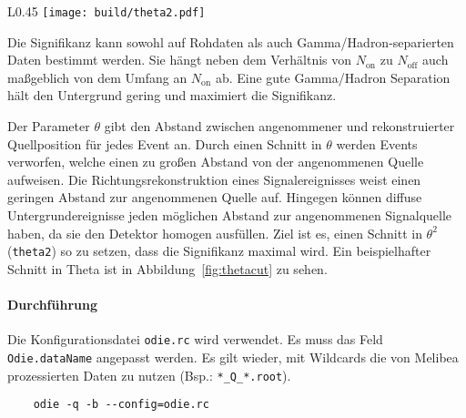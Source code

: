 \begin{wrapfigure}[13]{L}{0.45\textwidth}
		\centering
		\texttt{[image: build/theta2.pdf]}
		\caption{Theta2 Schnitt auf Daten zur Maximierung der Signifikanz.}%
		\label{fig:thetacut}
\end{wrapfigure}

Die Signifikanz kann sowohl auf Rohdaten als auch Gamma/Hadron-separierten Daten
bestimmt werden.
Sie hängt neben dem Verhältnis von $N_\text{on}$ zu $N_\text{off}$ auch
maßgeblich von dem Umfang an $N_\text{on}$ ab.
Eine gute Gamma/Hadron Separation hält den Untergrund gering und maximiert die
Signifikanz.

Der Parameter $\theta$ gibt den Abstand zwischen
angenommener und rekonstruierter Quellposition
für jedes Event an.
Durch einen Schnitt in $\theta$ werden Events verworfen,
welche einen zu großen Abstand von der angenommenen Quelle aufweisen.
Die Richtungsrekonstruktion eines Signalereignisses weist
einen geringen Abstand zur angenommenen Quelle auf.
Hingegen können diffuse Untergrundereignisse jeden möglichen Abstand zur
angenommenen Signalquelle haben,
da sie den Detektor homogen ausfüllen.
Ziel ist es, einen Schnitt in $\theta^2$ (\texttt{theta2}) so zu setzen,
dass die Signifikanz maximal wird.
Ein beispielhafter Schnitt in Theta ist in
Abbildung~\ref{fig:thetacut} zu sehen.


\paragraph{Durchführung}%

Die Konfigurations\-datei \texttt{odie.rc} wird verwendet.
Es muss das Feld \texttt{Odie.dataName} angepasst werden.
Es gilt wieder, mit Wildcards die von Melibea prozessierten Daten zu nutzen
(Bsp.: \texttt{*\_Q\_*.root}).

\begin{lstlisting}
	odie -q -b --config=odie.rc
\end{lstlisting}
